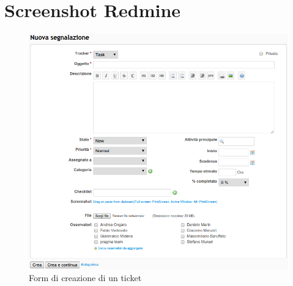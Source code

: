 \section{Screenshot Redmine}
\begin{figure}[H]
\centering
\includegraphics[width=14cm]{../immagini/nuovoTicket.png}
\caption{Form di creazione di un ticket}
\label{fig:assegnazioneTicket}
\end{figure}
